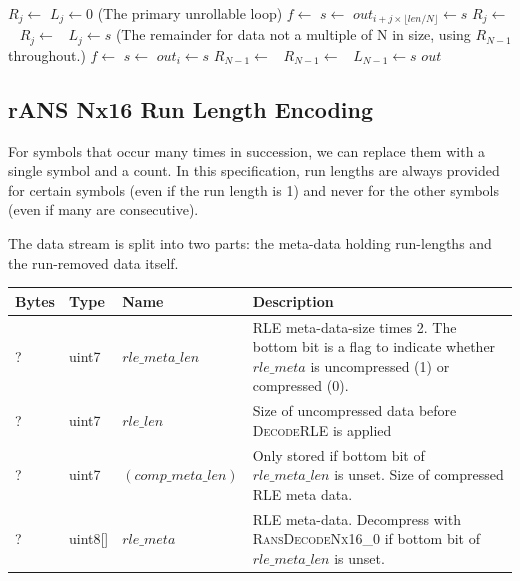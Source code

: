 \documentclass[a4paper]{article}
\begin{document}
\begin{algorithmic}[1]
  \State {}
    \State $R_j \gets$ 
    \State $L_j \gets 0$
  \EndFor
  \Statex (The primary unrollable loop)
        \State $f \gets$ 
      \State $s \gets$ 
      \State $out_{i + j \times \lfloor len/N \rfloor} \gets s$
      \State $R_j \gets$\ 
      \State $R_j \gets$\ 
      \State $L_j \gets s$
    \EndFor
  \EndFor
  \Statex (The remainder for data not a multiple of N in size, using $R_{N-1}$ throughout.)
    \State $f \gets$ 
    \State $s \gets$ 
    \State $out_i \gets s$
    \State $R_{N-1} \gets$\ 
    \State $R_{N-1} \gets$\ 
    \State $L_{N-1} \gets s$
  \EndFor
  \State \Return $out$
\EndFunction
\end{algorithmic}

\subsection{rANS Nx16 Run Length Encoding}
\label{sec:ransRLE}

For symbols that occur many times in succession, we can replace them
with a single symbol and a count.  In this specification, run lengths
are always provided for certain symbols (even if the run length
is 1) and never for the other symbols (even if many are consecutive).

The data stream is split into two parts: the meta-data holding
run-lengths and the run-removed data itself.

\begin{table}[h]
\centering
\begin{tabular}{lllp{9cm}}
\textbf{Bytes} & \textbf{Type} & \textbf{Name} & \textbf{Description}\\
\hline
? & uint7   & $rle\_meta\_len$     & RLE meta-data-size times 2. The bottom bit is a flag to indicate whether $rle\_meta$ is uncompressed (1) or compressed (0). \\
? & uint7   & $rle\_len$           & Size of uncompressed data before \textsc{DecodeRLE} is applied \\
? & uint7   & $(comp\_meta\_len)$  & Only stored if bottom bit of $rle\_meta\_len$ is unset.  Size of compressed RLE meta data. \\
? & uint8[] & $rle\_meta$          & RLE meta-data.  Decompress with \textsc{RansDecodeNx16\_0} if bottom bit of $rle\_meta\_len$ is unset. \\
\end{tabular}
\end{table}
\end{document}
